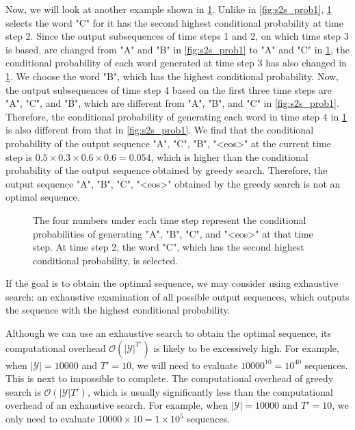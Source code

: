 Now, we will look at another example shown in \cref{fig:s2s_prob2}. Unlike in \cref{fig:s2s_prob1}, \cref{fig:s2s_prob2} selects the word "C" for it has the second highest conditional probability at time step 2. Since the output subsequences of time steps 1 and 2, on which time step 3 is based, are changed from "A" and "B" in \cref{fig:s2s_prob1} to "A" and "C" in \cref{fig:s2s_prob2}, the conditional probability of each word generated at time step 3 has also changed in \cref{fig:s2s_prob2}. We choose the word "B", which has the highest conditional probability. Now, the output subsequences of time step 4 based on the first three time steps are "A", "C", and "B", which are different from "A", "B", and "C" in \cref{fig:s2s_prob1}. Therefore, the conditional probability of generating each word in time step 4 in \cref{fig:s2s_prob2} is also different from that in \cref{fig:s2s_prob1}. We find that the conditional probability of the output sequence "A", "C", "B", "<eos>" at the current time step is $0.5\times0.3 \times0.6\times0.6=0.054$, which is higher than the conditional probability of the output sequence obtained by greedy search. Therefore, the output sequence "A", "B", "C", "<eos>" obtained by the greedy search is not an optimal sequence.

\begin{figure}[hpt]
	\centering
	
	\caption{The four numbers under each time step represent the conditional probabilities of generating "A", "B", "C", and "<eos>" at that time step.  At time step 2, the word "C", which has the second highest conditional probability, is selected.}
	\label{fig:s2s_prob2}
\end{figure}


If the goal is to obtain the optimal sequence, we may consider using exhaustive search: an exhaustive examination of all possible output sequences, which outputs the sequence with the highest conditional probability.

Although we can use an exhaustive search to obtain the optimal sequence, its computational overhead $\mathcal{O}(\left|\mathcal{Y}\right|^{T'})$ is likely to be excessively high. For example, when $|\mathcal{Y}|=10000$ and $T'=10$, we will need to evaluate $10000^{10} = 10^{40}$ sequences. This is next to impossible to complete. The computational overhead of greedy search is $\mathcal{O}(\left|\mathcal{Y}\right|T')$, which is usually significantly less than the computational overhead of an exhaustive search. For example, when $|\mathcal{Y}|=10000$ and $T'=10$, we only need to evaluate $10000\times10=1\times10^5$ sequences.

